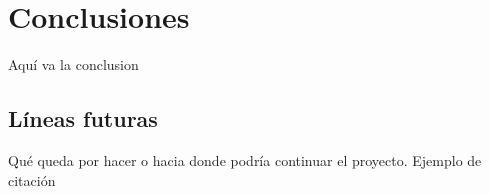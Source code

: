 \chapter{Conclusiones}
Aquí va la conclusion

\section{Líneas futuras}
Qué queda por hacer o hacia donde podría continuar el proyecto.
Ejemplo de citación \cite{Recos}
